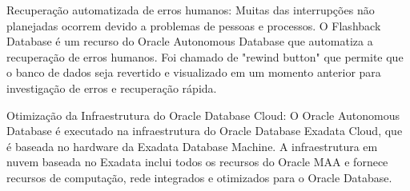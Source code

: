 \begin{alineas}
\item Recuperação automatizada de erros humanos: Muitas das interrupções não planejadas ocorrem devido a problemas de pessoas e processos. O Flashback Database é um recurso do Oracle Autonomous Database que automatiza a recuperação de erros humanos. Foi chamado de "rewind button" que permite que o banco de dados seja revertido e visualizado em um momento anterior para investigação de erros e recuperação rápida.

\item Otimização da Infraestrutura do Oracle Database Cloud: O Oracle Autonomous Database é executado na infraestrutura do Oracle Database Exadata Cloud, que é baseada no hardware da Exadata Database Machine. A infraestrutura em nuvem baseada no Exadata inclui todos os recursos do Oracle MAA e fornece recursos de computação, rede integrados e otimizados para o Oracle Database.
\end{alineas} 


